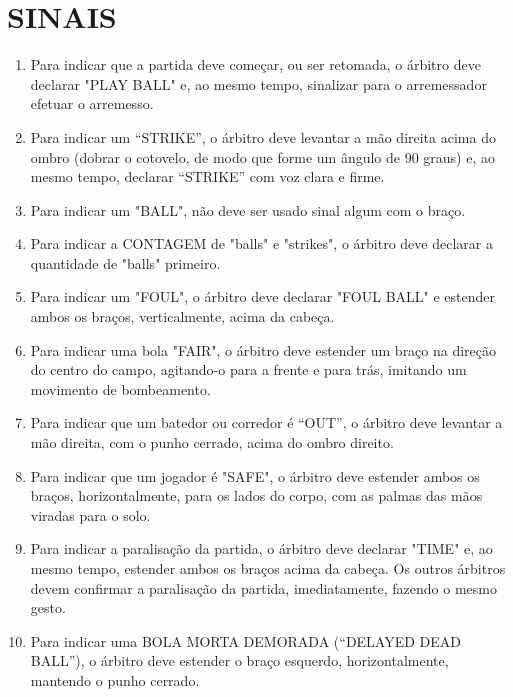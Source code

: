 \section{SINAIS}
\begin{multicols}{2}
	\begin{enumerate}[label=\alph*)]
		\item Para indicar que a partida deve começar, ou ser retomada, o árbitro deve declarar "PLAY BALL" e, ao mesmo tempo, sinalizar para o arremessador efetuar o arremesso.

		\item  Para indicar um “STRIKE”, o árbitro deve levantar a mão direita acima do ombro (dobrar o cotovelo, de modo que forme um ângulo de 90 graus) e, ao mesmo tempo, declarar “STRIKE” com voz clara e firme.

		\item  Para indicar um "BALL", não deve ser usado sinal algum com o braço.

		\item  Para indicar a CONTAGEM de "balls" e "strikes", o árbitro deve declarar a quantidade de "balls" primeiro.

		\item  Para indicar um "FOUL", o árbitro deve declarar "FOUL BALL" e estender ambos os braços, verticalmente, acima da cabeça.

		\item  Para indicar uma bola "FAIR", o árbitro deve estender um braço na direção do centro do campo, agitando-o para a frente e para trás, imitando um movimento de bombeamento.

		\item  Para indicar que um batedor ou corredor é “OUT”, o árbitro deve levantar a mão direita, com o punho cerrado, acima do ombro direito.

		\item  Para indicar que um jogador é "SAFE", o árbitro deve estender ambos os braços, horizontalmente, para os lados do corpo, com as palmas das mãos viradas para o solo.

		\item  Para indicar a paralisação da partida, o árbitro deve declarar "TIME" e, ao mesmo tempo, estender ambos os braços acima da cabeça. Os outros árbitros devem confirmar a paralisação da partida, imediatamente, fazendo o mesmo gesto.

		\item  Para indicar uma BOLA MORTA DEMORADA (“DELAYED DEAD BALL”), o árbitro deve estender o braço esquerdo, horizontalmente, mantendo o punho cerrado.


\end{enumerate}
\end{multicols}
